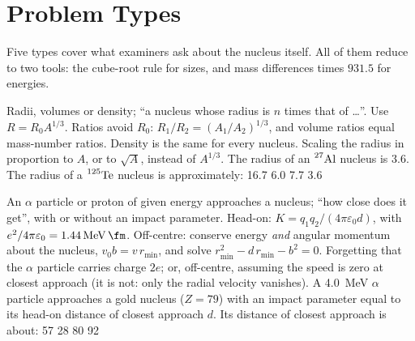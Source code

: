 \section{Problem Types}\label{sec:nuc-types}
Five types cover what examiners ask about the nucleus itself. All of them reduce to two tools: the
cube-root rule for sizes, and mass differences times $931.5$ for energies.

{Radii, volumes or density; ``a nucleus whose radius is $n$ times that of \dots''.}
{Use $R=R_0A^{1/3}$. Ratios avoid $R_0$: $R_1/R_2=(A_1/A_2)^{1/3}$, and volume ratios equal
mass-number ratios. Density is the same for every nucleus.}
{Scaling the radius in proportion to $A$, or to $\sqrt{A}$, instead of $A^{1/3}$.}
{The radius of an $\prescript{27}{}{\mathrm{Al}}$ nucleus is \SI{3.6}{\fm}. The radius of a $\prescript{125}{}{\mathrm{Te}}$ nucleus is
approximately:}
{\SI{16.7}{\fm}}
{\SI{6.0}{\fm}}
{\SI{7.7}{\fm}}
{\SI{3.6}{\fm}}

{An $\alpha$ particle or proton of given energy approaches a nucleus; ``how close does it get'', with or
without an impact parameter.}
{Head-on: $K=q_1q_2/(4\pi\varepsilon_0 d)$, with $e^2/4\pi\varepsilon_0=\SI{1.44}{\MeV.\fm}$. Off-centre:
conserve energy \emph{and} angular momentum about the nucleus, $v_0b=v\,r_{\min}$, and solve
$r_{\min}^2-d\,r_{\min}-b^2=0$.}
{Forgetting that the $\alpha$ particle carries charge $2e$; or, off-centre, assuming the speed is zero
at closest approach (it is not: only the radial velocity vanishes).}
{A \SI{4.0}{\MeV} $\alpha$ particle approaches a gold nucleus ($Z=79$) with an impact parameter equal
to its head-on distance of closest approach $d$. Its distance of closest approach is about:}
{\SI{57}{\fm}}
{\SI{28}{\fm}}
{\SI{80}{\fm}}
{\SI{92}{\fm}}

